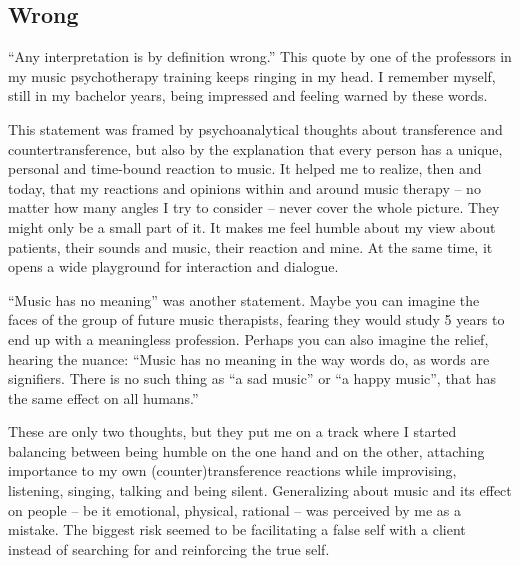 \documentclass[authordate, empirical, issue]{jote-new-article}
\author[1]{\mbox{Nele Fiers\orcid{0000-0002-8394-8598}}}
\affil[1]{Kliniek Sint-Jozef Pittem - Muze op maat}
\begin{document}
\begin{frontmatter}
  \maketitle
  \begin{abstract}
    \printabstracttext
  \end{abstract}
\end{frontmatter}


\setcounter{page}{29}

\subsection{Wrong}

“Any interpretation is by definition wrong.” This quote by one of the professors in my music psychotherapy training keeps ringing in my head. I remember myself, still in my bachelor years, being impressed and feeling warned by these words.



This statement was framed by psychoanalytical thoughts about transference and countertransference, but also by the explanation that every person has a unique, personal and time-bound reaction to music. It helped me to realize, then and today, that my reactions and opinions within and around music therapy -- no matter how many angles I try to consider -- never cover the whole picture. They might only be a small part of it. It makes me feel humble about my view about patients, their sounds and music, their reaction and mine. At the same time, it opens a wide playground for interaction and dialogue.



“Music has no meaning” was another statement. Maybe you can imagine the faces of the group of future music therapists, fearing they would study 5 years to end up with a meaningless profession. Perhaps you can also imagine the relief, hearing the nuance: “Music has no meaning in the way words do, as words are signifiers. There is no such thing as “a sad music” or “a happy music”, that has the same effect on all humans.”



These are only two thoughts, but they put me on a track where I started balancing between being humble on the one hand and on the other, attaching importance to my own (counter)transference reactions while improvising, listening, singing, talking and being silent. Generalizing about music and its effect on people -- be it emotional, physical, rational -- was perceived by me as a mistake. The biggest risk seemed to be facilitating a false self with a client instead of searching for and reinforcing the true self.
\end{document}
